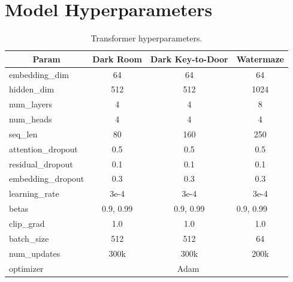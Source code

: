 \documentclass{article}
\theoremstyle{plain}
\theoremstyle{definition}
\theoremstyle{remark}
\begin{document}
\section{Model Hyperparameters}
\label{apndx:model_hyper}
\begin{table}[h!]
\centering
\begin{tabular}{@{}lccc@{}}
\toprule
\multicolumn{1}{c}{\textbf{Param}} & \multicolumn{1}{l}{\textbf{Dark Room}} & \textbf{Dark Key-to-Door} & \multicolumn{1}{l}{\textbf{Watermaze}} \\ \midrule
embedding\_dim     & 64     & 64     & 64     \\
hidden\_dim        & 512    & 512    & 1024   \\
num\_layers        & 4      & 4      & 8      \\
num\_heads         & 4      & 4      & 4      \\
seq\_len           & 80     & 160    & 250    \\
attention\_dropout & 0.5    & 0.5    & 0.5    \\
residual\_dropout  & 0.1    & 0.1    & 0.1    \\
embedding\_dropout & 0.3    & 0.3    & 0.3    \\ \midrule
learning\_rate     & 3e-4   & 3e-4   & 3e-4   \\
betas                              & 0.9, 0.99                              & 0.9, 0.99                 & \multicolumn{1}{l}{0.9, 0.99}          \\
clip\_grad         & 1.0    & 1.0    & 1.0    \\
batch\_size        & 512    & 512    & 64     \\
num\_updates       & 300k   & 300k   & 200k   \\
optimizer          & \multicolumn{3}{c}{Adam} \\ \bottomrule
\end{tabular}
\caption{Transformer hyperparameters.}
\label{tab:hyp-model}
\end{table}
\end{document}
